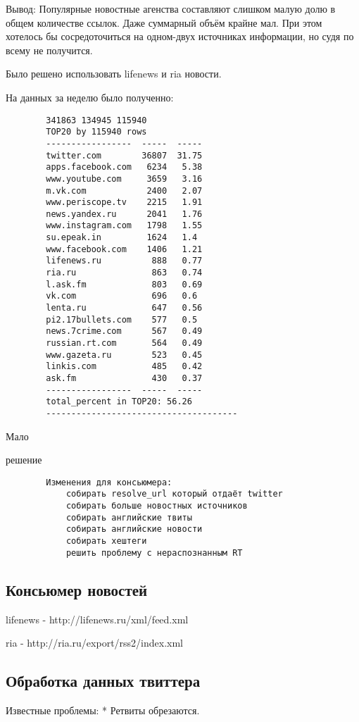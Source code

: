


        Вывод:
        Популярные новостные агенства составляют слишком малую долю в общем количестве ссылок. Даже суммарный объём крайне мал. При этом хотелось бы сосредоточиться на одном-двух источниках информации, но судя по всему не получится.

        Было решено использовать lifenews и ria новости.

        На данных за неделю было полученно:
        \begin{verbatim}
        341863 134945 115940
        TOP20 by 115940 rows
        -----------------  -----  -----
        twitter.com        36807  31.75
        apps.facebook.com   6234   5.38
        www.youtube.com     3659   3.16
        m.vk.com            2400   2.07
        www.periscope.tv    2215   1.91
        news.yandex.ru      2041   1.76
        www.instagram.com   1798   1.55
        su.epeak.in         1624   1.4
        www.facebook.com    1406   1.21
        lifenews.ru          888   0.77
        ria.ru               863   0.74
        l.ask.fm             803   0.69
        vk.com               696   0.6
        lenta.ru             647   0.56
        pi2.17bullets.com    577   0.5
        news.7crime.com      567   0.49
        russian.rt.com       564   0.49
        www.gazeta.ru        523   0.45
        linkis.com           485   0.42
        ask.fm               430   0.37
        -----------------  -----  -----
        total_percent in TOP20: 56.26
        --------------------------------------
        \end{verbatim}

        Мало

        решение
        \begin{verbatim}
        Изменения для консьюмера:
            собирать resolve_url который отдаёт twitter
            собирать больше новостных источников
            собирать английские твиты
            собирать английские новости
            собирать хештеги
            решить проблему с нераспознанным RT
        \end{verbatim}

    \subsection{Консьюмер новостей}
        lifenews - http://lifenews.ru/xml/feed.xml

        ria - http://ria.ru/export/rss2/index.xml


    \subsection{Обработка данных твиттера}
        Известные проблемы: 
        * Ретвиты обрезаются.

